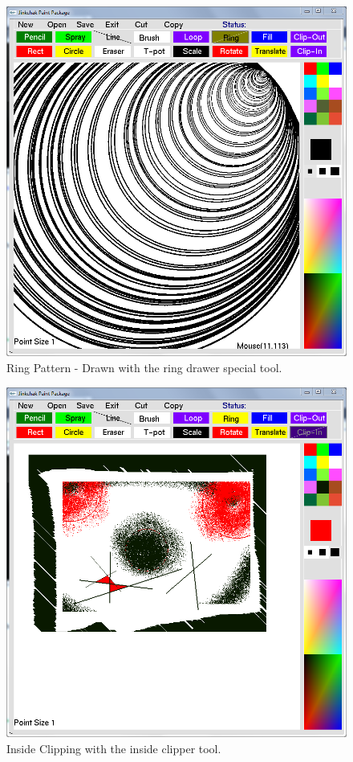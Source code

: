 \documentclass[12pt]{report}
\begin{document}
\begin{figure}[h!]
  
  \centering
    \includegraphics[scale=0.45]{screenshots/ring_pattern.png}
\caption{Ring Pattern - Drawn with the ring drawer special tool.}
\end{figure}

\begin{figure}[h!]
  
  \centering
    \includegraphics[scale=0.45]{screenshots/inside_clip.png}
\caption{Inside Clipping with the inside clipper tool.}
\end{figure}
\end{document}

